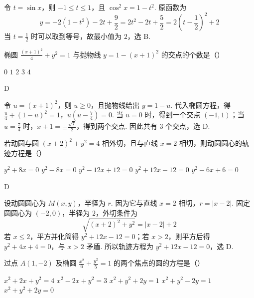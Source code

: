 \documentclass[UTF8,a4paper,oneside,11pt]{ctexbook}
\begin{document}
\begin{solution}
令 \(t=\sin x\)，则 \(-1\leq t\leq1\)，且 \(\cos^2x=1-t^2\). 原函数为
\[
y=-2(1-t^2)-2t+\frac{9}{2}=2t^2-2t+\frac{5}{2}=2\left(t-\frac{1}{2}\right)^2+2
\]
当 \(t=\frac{1}{2}\) 时可以取到等号，故最小值为 \(2\)，选 B.
\end{solution}


\begin{problem}

椭圆 \(\frac{(x + 1)^2}{4} + y^2 = 1\) 与抛物线 \(y = 1 - (x + 1)^2\) 的交点的个数是（\quad）

\choicesfive
    {\(0\)}
    {\(1\)}
    {\(2\)}
    {\(3\)}
    {\(4\)}
\end{problem}

\begin{answer}
D
\end{answer}

\begin{solution}
令 \(u=(x+1)^2\)，则 \(u\geq0\)，且抛物线给出 \(y=1-u\). 代入椭圆方程，得
\(\frac{u}{4}+(1-u)^2=1\)，\(u\left(u-\frac{7}{4}\right)=0\).
当 \(u=0\) 时，得到一个交点 \((-1,1)\)；当 \(u=\frac{7}{4}\) 时，\(x+1=\pm\frac{\sqrt{7}}{2}\)，得到两个交点. 因此共有 \(3\) 个交点，选 D.
\end{solution}


\begin{problem}

若动圆与圆 \((x+2)^{2}+y^{2}=4 \) 相外切，且与直线 \(x=2\) 相切，则动圆圆心的轨迹方程是（\quad）

\choicesfive
    {\(y^{2} + 8x = 0 \)}
    {\(y^{2}-8x=0 \)}
    {\(y^{2}-12x+12=0 \)}
    {\(y^{2} + 12x - 12 = 0 \)}
    {\(y^{2}-6x+6=0 \)}
\end{problem}

\begin{answer}
D
\end{answer}

\begin{solution}
设动圆圆心为 \(M(x,y)\)，半径为 \(r\). 因为它与直线 \(x=2\) 相切，\(r=|x-2|\). 固定圆圆心为 \((-2,0)\)，半径为 \(2\)，外切条件为
\[
\sqrt{(x+2)^2+y^2}=|x-2|+2
\]
若 \(x\leq2\)，平方并化简得 \(y^2+12x-12=0\)；若 \(x>2\)，则平方后得 \(y^2+4x+4=0\)，与 \(x>2\) 矛盾. 所以轨迹方程为 \(y^2+12x-12=0\)，选 D.
\end{solution}


\begin{problem}

过点 \(A(1, -2)\) 及椭圆 \(\frac{x^2}{6} + \frac{y^2}{5} = 1\) 的两个焦点的圆的方程是（\quad）

\choicesfive
    {\(x^{2} + 2x + y^{2} = 4\)}
    {\(x^{2} - 2x + y^{2} = 3\)}
    {\(x^{2} + y^{2} + 2y = 1\)}
    {\(x^{2} + y^{2} - 2y = 1\)}
    {\(x^{2} + y^{2} + 2y = 0\)}
\end{problem}
\end{document}
